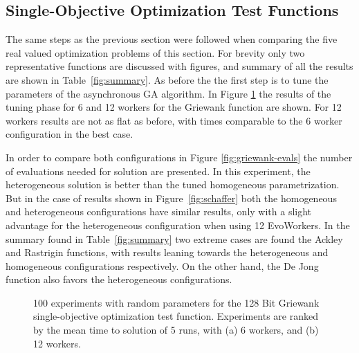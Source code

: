 \documentclass{llncs}
\begin{document}
\subsection{ Single-Objective Optimization Test Functions}
The same steps as the previous section were followed when comparing the five real valued 
optimization problems of this section. For brevity only two representative functions are discussed
with figures, and summary of all the results are shown in Table~\ref{fig:summary}. As before
the the first step is to tune the parameters of the 
asynchronous GA algorithm. In Figure \ref{fig:griewank} the results of the tuning 
phase for 6 and 12 workers for the Griewank function are shown. For 12 workers
results are not as flat as before, with times comparable to the 6 worker 
configuration in the best case.

In order to compare both configurations in Figure \ref{fig:griewank-evals} the number of evaluations 
needed for solution are presented. In this experiment, the heterogeneous solution is better than the
tuned homogeneous parametrization. But in the case of results shown in Figure~\ref{fig:schaffer} 
both the homogeneous and heterogeneous configurations have similar results, 
only with a slight advantage
for the heterogeneous configuration when using 12 EvoWorkers. In the summary found in
Table~\ref{fig:summary} two extreme cases are found the Ackley and Rastrigin functions, 
with results leaning
towards the heterogeneous and homogeneous configurations respectively. On the other hand, the De Jong
function also favors the heterogeneous configurations. 



\begin{figure}[b]
    \centering

    \caption{100 experiments with random parameters for the 128 Bit Griewank 
    single-objective optimization test function. Experiments are ranked by 
    the mean time to solution of 5 runs, with (a) 6 workers, and (b) 12 workers.}
    \label{fig:griewank}
\end{figure}
\end{document}
